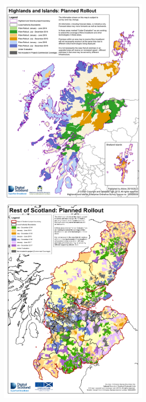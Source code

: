 \documentclass{beamer}
\begin{document}
\begin{frame}
\begin{columns}
    \hspace{-2em}\includegraphics[width=0.55\textwidth]{HIE-NGA-Deployment-2013-10-25.pdf}
    \includegraphics[width=0.55\textwidth]{ros.png}
  \end{columns}
\end{frame}
\end{document}
